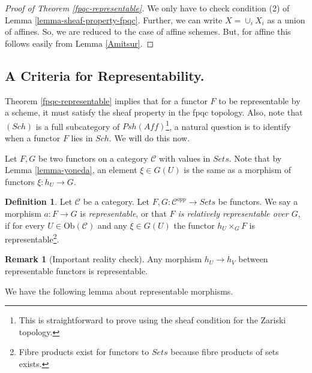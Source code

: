 \documentclass[11pt]{amsart}
\newcommand{\Ob}{\text{Ob}}
\theoremstyle{definition}
\newtheorem{definition}[theorem]{Definition}
\newtheorem{remark}[theorem]{Remark}
\begin{document}
\begin{proof}[Proof of Theorem \ref{fpqc-representable}]
We only have to check condition (2) of Lemma \ref{lemma-sheaf-property-fpqc}. Further, we can write $X=\cup_i X_i$ as a union of affines. So, we are reduced to the case of affine schemes. But, for affine this follows easily from Lemma \ref{Amitsur}.
\end{proof}

\subsection{A Criteria for Representability.} Theorem \ref{fpqc-representable} implies that for a functor $F$ to be representable by a scheme, it must satisfy the sheaf property in the fpqc topology. Also, note that $(\mathit{Sch})$ is a full subcategory of $\mathit{Psh}(\mathit{Aff})$\footnote{This is straightforward to prove using the sheaf condition for the Zariski topology.}, a natural question is to identify when a functor $F$ lies in $\mathit{Sch}$. We will do this now.

Let $F,G$ be two functors on a category $\mathcal{C}$ with values in $\mathit{Sets}$. Note that by Lemma \ref{lemma-yoneda}, an element $\xi\in G(U)$ is the same as a morphism of functors $\xi: h_U\rightarrow G$.


\begin{definition}
	\label{definition-representable-map-presheaves}
	Let $\mathcal{C}$ be a category.
	Let $F, G : \mathcal{C}^{opp} \to \textit{Sets}$
	be functors. We say a morphism $a : F \to G$ is
	{\it representable}, or that {\it $F$ is relatively representable
		over $G$}, if for every $U \in \Ob(\mathcal{C})$
	and any $\xi \in G(U)$ the functor
	$h_U \times_G F$ is representable\footnote{Fibre products exist for functors to $\mathit{Sets}$ because fibre products of sets exists.}.
\end{definition}

\begin{remark}[Important reality check]
	Any morphism $h_U\rightarrow h_V$ between representable functors is representable.
\end{remark}
We have the following lemma about representable morphisms.
\end{document}
